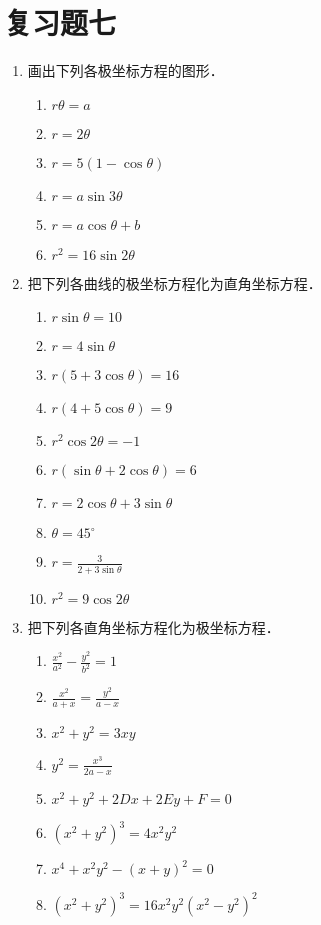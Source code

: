 \section*{复习题七}

\begin{enumerate}
    \item 画出下列各极坐标方程的图形．
\begin{multicols}{2}
    \begin{enumerate}
        \item $r\theta =a$
        \item $r=2\theta$
        \item $r=5(1-\cos\theta )$
        \item $r=a\sin3\theta$
        \item $r=a\cos\theta +b$
        \item $r^2=16\sin 2\theta$
    \end{enumerate}
\end{multicols}

\item 把下列各曲线的极坐标方程化为直角坐标方程．
\begin{multicols}{2}
\begin{enumerate}
\item $r\sin\theta =10$
\item $r=4\sin\theta$
\item $r(5+3\cos\theta )=16$
\item $r(4+5\cos\theta )=9$
\item $r^2\cos2\theta =-1$
\item $r(\sin\theta +2\cos\theta )=6$
\item $r=2\cos\theta +3\sin\theta $
\item $\theta =45^{\circ}$
\item $r=\frac{3}{2+3\sin\theta}$ 
\item $r^2=9\cos2\theta $
\end{enumerate}
\end{multicols}

\item 把下列各直角坐标方程化为极坐标方程．
\begin{multicols}{2}
  \begin{enumerate}
\item $\frac{x^2}{a^2}-\frac{y^2}{b^2}=1$
\item $\frac{x^2}{a+x}=\frac{y^2}{a-x}$
\item $x^2+y^2=3xy$
\item $y^2=\frac{x^3}{2a-x}$
\item $x^2+y^2+2Dx+2Ey+F=0$
\item $(x^2+y^2)^3=4x^2y^2$
\item $x^4+x^2y^2-(x+y)^2=0$
\item $(x^2+y^2)^3=16x^2y^2(x^2-y^2)^2$
\end{enumerate}  
\end{multicols}



\end{enumerate}
